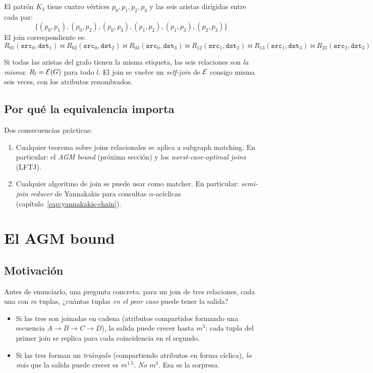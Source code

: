 \begin{ejemplo}
El patrón \(K_4\) tiene cuatro vértices \(p_0, p_1, p_2, p_3\) y las
seis aristas dirigidas entre cada par:
\[
\{(p_0, p_1), (p_0, p_2), (p_0, p_3),
  (p_1, p_2), (p_1, p_3), (p_2, p_3)\}
\]
El join correspondiente es:
\[
R_{01}(\texttt{src}_0, \texttt{dst}_1)
  \bowtie R_{02}(\texttt{src}_0, \texttt{dst}_2)
  \bowtie R_{03}(\texttt{src}_0, \texttt{dst}_3)
  \bowtie R_{12}(\texttt{src}_1, \texttt{dst}_2)
  \bowtie R_{13}(\texttt{src}_1, \texttt{dst}_3)
  \bowtie R_{23}(\texttt{src}_2, \texttt{dst}_3)
\]

Si todas las aristas del grafo tienen la misma etiqueta, las seis
relaciones son \emph{la misma}: \(R_l = \mathcal{E}(G)\) para todo \(l\). El
join se vuelve un \emph{self-join} de \(\mathcal{E}\) consigo misma seis
veces, con los atributos renombrados.
\end{ejemplo}

\subsection{Por qué la equivalencia importa}

Dos consecuencias prácticas:

\begin{enumerate}
    \item Cualquier teorema sobre joins relacionales se aplica a
    subgraph matching. En particular: el \emph{AGM bound}
    (próxima sección) y los \emph{worst-case-optimal joins} (LFTJ).
    \item Cualquier algoritmo de join se puede usar como matcher.
    En particular: \emph{semi-join reducer} de Yannakakis para
    consultas \(\alpha\)-acíclicas (capítulo~\ref{cap:yannakakis-chain}).
\end{enumerate}

\section{El AGM bound}

\subsection{Motivación}

Antes de enunciarlo, una pregunta concreta: para un join de tres
relaciones, cada una con \(m\) tuplas, ¿cuántas tuplas \emph{en el
peor caso} puede tener la salida?

\begin{itemize}
    \item Si las tres son joinadas en cadena (atributos compartidos
    formando una secuencia \(A \to B \to C \to D\)), la salida puede
    crecer hasta \(m^3\): cada tupla del primer join se replica para
    cada coincidencia en el segundo.
    \item Si las tres forman un \emph{triángulo} (compartiendo
    atributos en forma cíclica), \emph{lo más} que la salida puede
    crecer es \(m^{1.5}\). \emph{No} \(m^3\). Esa es la sorpresa.
\end{itemize}

